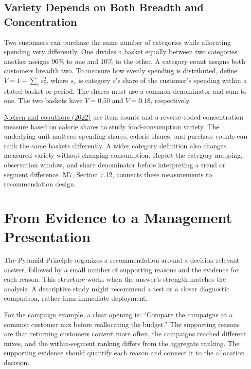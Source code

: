 \hypertarget{M02-variety-depends-on-both-breadth-and-concentration}{%
\subsection{Variety Depends on Both Breadth and
Concentration}\label{M02-variety-depends-on-both-breadth-and-concentration}}

\noindent Two customers can purchase the same number of categories while
allocating spending very differently. One divides a basket equally
between two categories; another assigns 90\% to one and 10\% to the
other. A category count assigns both customers breadth two. To measure
how evenly spending is distributed, define \(V=1-\sum_c s_c^2\), where
\(s_c\) is category \(c\)'s share of the customer's spending within a
stated basket or period. The shares must use a common denominator and
sum to one. The two baskets have \(V=0.50\) and \(V=0.18\),
respectively.

\href{https://doi.org/10.1086/720453}{Nielsen and coauthors (2022)} use
item counts and a reverse-coded concentration measure based on calorie
shares to study food-consumption variety. The underlying unit matters:
spending shares, calorie shares, and purchase counts can rank the same
baskets differently. A wider category definition also changes measured
variety without changing consumption. Report the category mapping,
observation window, and share denominator before interpreting a trend or
segment difference. M7, Section 7.12, connects these measurements to
recommendation design.

\hypertarget{M02-from-evidence-to-a-management-presentation}{%
\section{From Evidence to a Management
Presentation}\label{M02-from-evidence-to-a-management-presentation}}

\noindent The Pyramid Principle organizes a recommendation around a
decision-relevant answer, followed by a small number of supporting
reasons and the evidence for each reason. This structure works when the
answer's strength matches the analysis. A descriptive study might
recommend a test or a closer diagnostic comparison, rather than
immediate deployment.

For the campaign example, a clear opening is: ``Compare the campaigns at
a common customer mix before reallocating the budget.'' The supporting
reasons are that returning customers convert more often, the campaigns
reached different mixes, and the within-segment ranking differs from the
aggregate ranking. The supporting evidence should quantify each reason
and connect it to the allocation decision.

